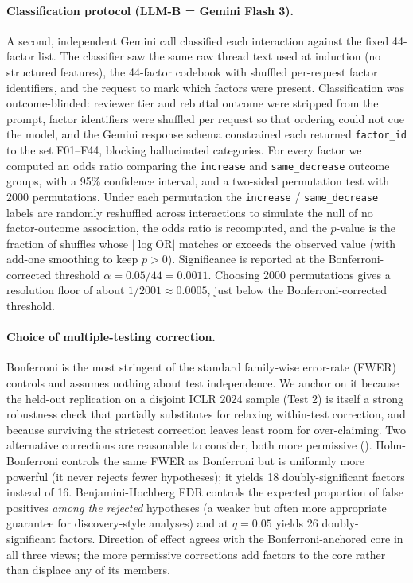 \documentclass{article}
\newcommand{\code}[1]{\texttt{#1}}
\begin{document}
\paragraph{Classification protocol (LLM-B = Gemini Flash 3).}
A second, independent Gemini call classified each interaction against the fixed 44-factor list. The classifier saw the same raw thread text used at induction (no structured features), the 44-factor codebook with shuffled per-request factor identifiers, and the request to mark which factors were present. Classification was outcome-blinded: reviewer tier and rebuttal outcome were stripped from the prompt, factor identifiers were shuffled per request so that ordering could not cue the model, and the Gemini response schema constrained each returned \code{factor\_id} to the set F01--F44, blocking hallucinated categories. For every factor we computed an odds ratio comparing the \code{increase} and \code{same\_decrease} outcome groups, with a 95\% confidence interval, and a two-sided permutation test with 2000 permutations. Under each permutation the \code{increase} / \code{same\_decrease} labels are randomly reshuffled across interactions to simulate the null of no factor-outcome association, the odds ratio is recomputed, and the $p$-value is the fraction of shuffles whose $|\log \text{OR}|$ matches or exceeds the observed value (with add-one smoothing to keep $p > 0$). Significance is reported at the Bonferroni-corrected threshold $\alpha = 0.05 / 44 = 0.0011$. Choosing 2000 permutations gives a resolution floor of about $1/2001 \approx 0.0005$, just below the Bonferroni-corrected threshold.

\paragraph{Choice of multiple-testing correction.}
Bonferroni is the most stringent of the standard family-wise error-rate (FWER) controls and assumes nothing about test independence. We anchor on it because the held-out replication on a disjoint ICLR 2024 sample (Test 2) is itself a strong robustness check that partially substitutes for relaxing within-test correction, and because surviving the strictest correction leaves least room for over-claiming. Two alternative corrections are reasonable to consider, both more permissive (). Holm-Bonferroni controls the same FWER as Bonferroni but is uniformly more powerful (it never rejects fewer hypotheses); it yields 18 doubly-significant factors instead of 16. Benjamini-Hochberg FDR controls the expected proportion of false positives \emph{among the rejected} hypotheses (a weaker but often more appropriate guarantee for discovery-style analyses) and at $q = 0.05$ yields 26 doubly-significant factors. Direction of effect agrees with the Bonferroni-anchored core in all three views; the more permissive corrections add factors to the core rather than displace any of its members.
\end{document}

